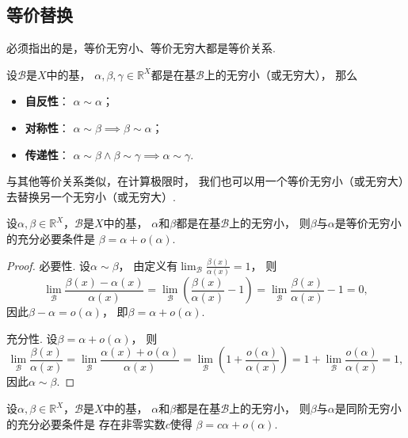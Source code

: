 \subsection{等价替换}
必须指出的是，等价无穷小、等价无穷大都是等价关系.
\begin{property}
设\(\mathcal{B}\)是\(X\)中的基，
\(\alpha,\beta,\gamma\in\mathbb{R}^X\)都是在基\(\mathcal{B}\)上的无穷小（或无穷大），
那么\begin{itemize}
	\item {\rm\bf 自反性}：
	\(\alpha \sim \alpha\)；

	\item {\rm\bf 对称性}：
	\(\alpha \sim \beta \implies \beta \sim \alpha\)；

	\item {\rm\bf 传递性}：
	\(\alpha \sim \beta \land \beta \sim \gamma \implies \alpha \sim \gamma\).
\end{itemize}
\end{property}

与其他等价关系类似，在计算极限时，
我们也可以用一个等价无穷小（或无穷大）去替换另一个无穷小（或无穷大）.

\begin{theorem}\label{theorem:极限.无穷小的比较1}
设\(\alpha,\beta\in\mathbb{R}^X\)，\(\mathcal{B}\)是\(X\)中的基，
\(\alpha\)和\(\beta\)都是在基\(\mathcal{B}\)上的无穷小，
则\(\beta\)与\(\alpha\)是等价无穷小的充分必要条件是
\(\beta = \alpha + o(\alpha)\).
\begin{proof}
必要性.
设\(\alpha\sim\beta\)，
由定义有\(\lim_\mathcal{B} \frac{\beta(x)}{\alpha(x)} = 1\)，
则\begin{equation*}
	\lim_\mathcal{B} \frac{\beta(x)-\alpha(x)}{\alpha(x)}
	= \lim_\mathcal{B} \left(\frac{\beta(x)}{\alpha(x)}-1\right)
	= \lim_\mathcal{B} \frac{\beta(x)}{\alpha(x)}-1 = 0,
\end{equation*}
因此\(\beta-\alpha=o(\alpha)\)，
即\(\beta=\alpha+o(\alpha)\).

充分性.
设\(\beta=\alpha+o(\alpha)\)，
则\begin{equation*}
	\lim_\mathcal{B} \frac{\beta(x)}{\alpha(x)}
	= \lim_\mathcal{B} \frac{\alpha(x)+o(\alpha)}{\alpha(x)}
	= \lim_\mathcal{B} \left(1+\frac{o(\alpha)}{\alpha(x)}\right)
	= 1 + \lim_\mathcal{B} \frac{o(\alpha)}{\alpha(x)}
	= 1,
\end{equation*}
因此\(\alpha\sim\beta\).
\end{proof}
\end{theorem}
\begin{corollary}
设\(\alpha,\beta\in\mathbb{R}^X\)，\(\mathcal{B}\)是\(X\)中的基，
\(\alpha\)和\(\beta\)都是在基\(\mathcal{B}\)上的无穷小，
则\(\beta\)与\(\alpha\)是同阶无穷小的充分必要条件是
存在非零实数\(c\)使得
\(\beta = c \alpha + o(\alpha)\).
\end{corollary}


